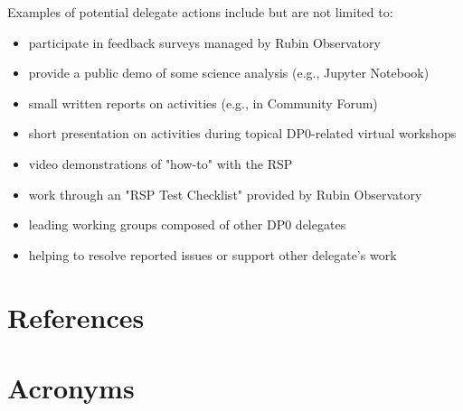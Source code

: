 \documentclass[DM,lsstdraft,authoryear,toc]{lsstdoc}
\begin{document}
Examples of potential delegate actions include but are not limited to:
\begin{itemize}
\item participate in feedback surveys managed by Rubin Observatory
\item provide a public demo of some science analysis (e.g., Jupyter Notebook)
\item small written reports on activities (e.g., in Community Forum)
\item short presentation on activities during topical DP0-related virtual workshops
\item video demonstrations of "how-to" with the RSP
\item work through an "RSP Test Checklist" provided by Rubin Observatory
\item leading working groups composed of other DP0 delegates
\item helping to resolve reported issues or support other delegate's work
\end{itemize}


\appendix
\section{References} \label{sec:bib}
\renewcommand{\refname}{} %


\section{Acronyms}



% 
\end{document}

